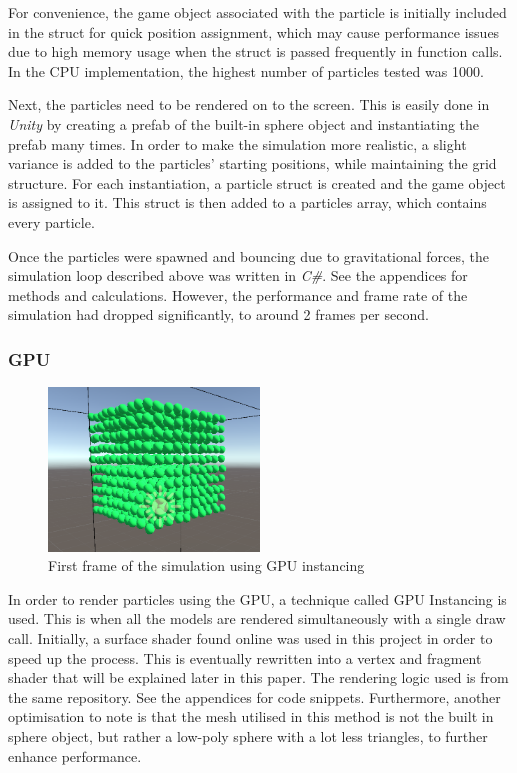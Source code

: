 \documentclass[a4paper, 12pt]{article}
\begin{document}
    For convenience, the game object associated with the particle is initially included in the struct for quick position assignment, which may cause performance issues due to high memory usage when the struct is passed frequently in function calls. In the CPU implementation, the highest number of particles tested was 1000.
    
    Next, the particles need to be rendered on to the screen. This is easily done in \textit{Unity} by creating a prefab of the built-in sphere object and instantiating the prefab many times. In order to make the simulation more realistic, a slight variance is added to the particles' starting positions, while maintaining the grid structure. For each instantiation, a particle struct is created and the game object is assigned to it. This struct is then added to a particles array, which contains every particle.

    Once the particles were spawned and bouncing due to gravitational forces, the simulation loop described above was written in \textit{C\#}. See the appendices for methods and calculations. However, the performance and frame rate of the simulation had dropped significantly, to around 2 frames per second.

    \subsubsection{GPU}

    \begin{figure}[H]
        \begin{center}
            \includegraphics[width=0.5\textwidth]{firstFrameGPU.png}
            \caption{First frame of the simulation using GPU instancing}
        \end{center}
    \end{figure}

    In order to render particles using the GPU, a technique called GPU Instancing is used. This is when all the models are rendered simultaneously with a single draw call. Initially, a surface shader found online was used in this project in order to speed up the process\cite{gpuinstanceshader}. This is eventually rewritten into a vertex and fragment shader that will be explained later in this paper. The rendering logic used is from the same repository. See the appendices for code snippets. Furthermore, another optimisation to note is that the mesh utilised in this method is not the built in sphere object, but rather a low-poly sphere with a lot less triangles, to further enhance performance.
\end{document}
